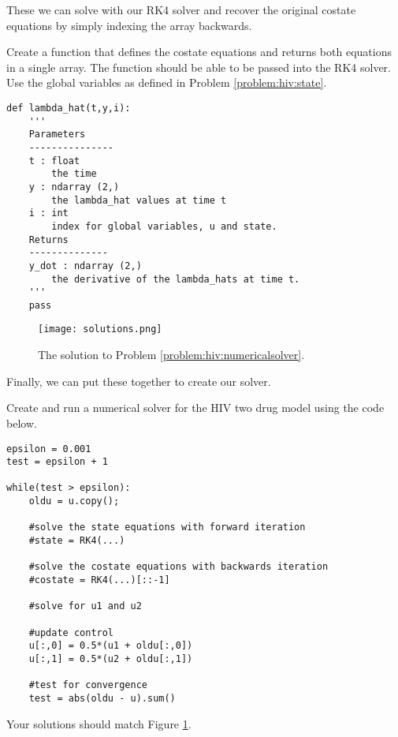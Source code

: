 These we can solve with our RK4 solver and recover the original costate equations by simply indexing the array backwards.

\begin{problem}
Create a function that defines the costate equations and returns both equations in a single array. The function should be able to be passed into the RK4 solver. Use the global variables as defined in Problem \ref{problem:hiv:state}.

\begin{lstlisting}
def lambda_hat(t,y,i):
	'''
	Parameters
	---------------
	t : float
		the time
	y : ndarray (2,)
		the lambda_hat values at time t
	i : int
		index for global variables, u and state.
	Returns
	--------------
	y_dot : ndarray (2,)
		the derivative of the lambda_hats at time t.
	'''
	pass
\end{lstlisting}

\label{problem:hiv:costateequations}
\end{problem}


\begin{figure}
\centering
\texttt{[image: solutions.png]}
\caption{The solution to Problem \ref{problem:hiv:numericalsolver}.}
\label{fig:hiv:solutions}
\end{figure}



Finally, we can put these together to create our solver.
\begin{problem}
Create and run a numerical solver for the HIV two drug model using the code below.

\begin{lstlisting}
epsilon = 0.001
test = epsilon + 1

while(test > epsilon):
	oldu = u.copy();
    
	#solve the state equations with forward iteration
	#state = RK4(...)
    
	#solve the costate equations with backwards iteration
	#costate = RK4(...)[::-1]
	
	#solve for u1 and u2
    
	#update control
	u[:,0] = 0.5*(u1 + oldu[:,0])
	u[:,1] = 0.5*(u2 + oldu[:,1])

	#test for convergence
	test = abs(oldu - u).sum()
\end{lstlisting}

Your solutions should match Figure \ref{fig:hiv:solutions}.
\label{problem:hiv:solver}

\label{problem:hiv:numericalsolver}
\end{problem}


